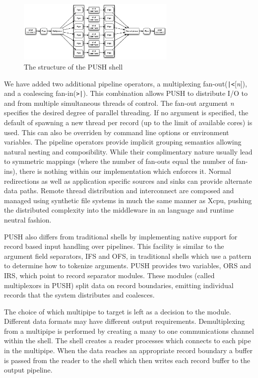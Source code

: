 \documentclass{sig-alt-release2}
\begin{document}
\begin{figure}[htp]
\centering
\includegraphics[width=3in]{pipestruct.eps}
\caption{The structure of the PUSH shell}
\label{fig:pipestruct} 
\end{figure}

We have added two additional pipeline operators, 
a multiplexing fan-out(\verb!|<![\emph{n}]), and a coalescing fan-in(\verb!>|!). 
This combination allows PUSH to distribute I/O to and from multiple
simultaneous threads of control.
The fan-out argument \emph{n} specifies the desired degree of parallel 
threading.  If no argument is specified, the default of spawning a new
thread per record (up to the limit of available cores) is used.  This can
also be overriden by command line options or environment variables.
The pipeline operators provide implicit grouping semantics allowing natural 
nesting and composibility.
While their complimentary nature usually lead to symmetric
mappings (where the number of fan-outs equal the number of fan-ins), there is 
nothing within our implementation which enforces it.
Normal redirections as well as application specific sources and sinks 
can provide alternate data paths.
Remote thread distribution and interconnect are composed and managed
using synthetic file systems in much the same manner as Xcpu, 
pushing the distributed complexity into the middleware in an language and 
runtime neutral fashion.

PUSH also differs from traditional shells by implementing native support for 
record based input handling over pipelines. This facility is similar to the 
argument field separators, IFS and OFS, in traditional shells which use a 
pattern to determine how to tokenize arguments. PUSH provides two variables, 
ORS and IRS, which point to record separator modules. These modules 
(called multiplexors in PUSH) split data on record boundaries, emitting 
individual records that the system distributes and coalesces. 

The choice of which multipipe to target is left as a decision to the module. 
Different data formats may have different output requirements. 
Demultiplexing from a multipipe is performed by creating a many to one 
communications channel within the shell. The shell creates a reader processes 
which connects to each pipe in the multipipe. When the data reaches an 
appropriate record boundary a buffer is passed from the reader to the shell 
which then writes each record buffer to the output pipeline. 
\end{document}
